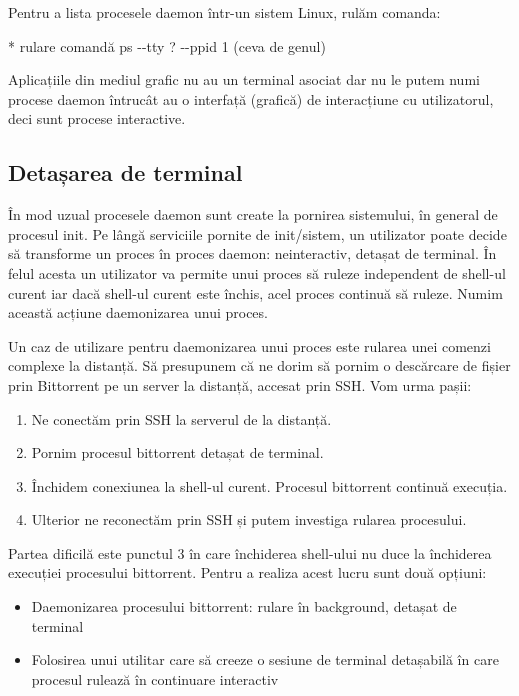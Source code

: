Pentru a lista procesele daemon într-un sistem Linux, rulăm comanda:

* rulare comandă ps -{}-tty ? -{}-ppid 1 (ceva de genul)

Aplicațiile din mediul grafic nu au un terminal asociat dar nu le putem numi
procese daemon întrucât au o interfață (grafică) de interacțiune cu
utilizatorul, deci sunt procese interactive.

\subsection{Detașarea de terminal}
\label{sec:procese-interactivitate-detasare}

În mod uzual procesele daemon sunt create la pornirea sistemului, în general de
procesul init. Pe lângă serviciile pornite de init/sistem, un utilizator poate
decide să transforme un proces în proces daemon: neinteractiv, detașat de
terminal. În felul acesta un utilizator va permite unui proces să ruleze
independent de shell-ul curent iar dacă shell-ul curent este închis, acel proces
continuă să ruleze. Numim această acțiune daemonizarea unui proces.

Un caz de utilizare pentru daemonizarea unui proces este rularea unei comenzi
complexe la distanță. Să presupunem că ne dorim să pornim o descărcare de fișier
prin Bittorrent pe un server la distanță, accesat prin SSH. Vom urma pașii:

\begin{enumerate}
	\item Ne conectăm prin SSH la serverul de la distanță.
	\item Pornim procesul bittorrent detașat de terminal.
	\item Închidem conexiunea la shell-ul curent. Procesul bittorrent
		continuă execuția.
	\item Ulterior ne reconectăm prin SSH și putem investiga rularea
		procesului.
\end{enumerate}

Partea dificilă este punctul 3 în care închiderea shell-ului nu duce la
închiderea execuției procesului bittorrent. Pentru a realiza acest lucru sunt
două opțiuni:

\begin{itemize}
	\item Daemonizarea procesului bittorrent: rulare în background, detașat de terminal
	\item Folosirea unui utilitar care să creeze o sesiune de terminal detașabilă în care procesul rulează în continuare interactiv
\end{itemize}

